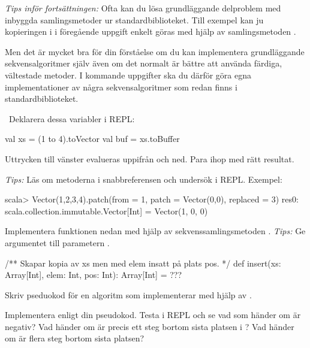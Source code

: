 \ifPreSolution
\begin{framed}
\noindent\emph{Tips inför fortsättningen:} Ofta kan du lösa grundläggande delproblem med inbyggda samlingsmetoder ur standardbiblioteket. Till exempel kan ju kopieringen i  i föregående uppgift enkelt göras med hjälp av samlingsmetoden .

Men det är mycket bra för din förståelse om du kan implementera grundläggande sekvensalgoritmer själv även om det normalt är bättre att använda färdiga, vältestade  metoder. I kommande uppgifter ska du därför göra egna implementationer av några sekvensalgoritmer som redan finns i standardbiblioteket.
\end{framed}
\fi




\QUESTBEGIN

\Task \what~Deklarera dessa variabler i REPL:

\begin{Code}
val xs = (1 to 4).toVector
val buf = xs.toBuffer
\end{Code}

\Subtask Uttrycken till vänster evalueras uppifrån och ned. Para ihop med rätt resultat.

\begin{ConceptConnections}

\end{ConceptConnections}
\emph{Tips:} Läs om metoderna i snabbreferensen och undersök i REPL. Exempel:
\begin{REPL}
scala> Vector(1,2,3,4).patch(from = 1, patch = Vector(0,0), replaced = 3)
res0: scala.collection.immutable.Vector[Int] = Vector(1, 0, 0)
\end{REPL}

\Subtask Implementera funktionen  nedan med hjälp av sekvenssamlingsmetoden . \emph{Tips:} Ge argumentet  till parametern .
\begin{Code}
/** Skapar kopia av xs men med elem insatt på plats pos. */
def insert(xs: Array[Int], elem: Int, pos: Int): Array[Int] = ???
\end{Code}

\Subtask Skriv pseduokod för en algoritm som implementerar  med hjälp av .

\Subtask Implementera  enligt din pseudokod. Testa i REPL och se vad som händer om  är negativ? Vad händer om  är precis ett steg bortom sista platsen i ? Vad händer om  är flera steg bortom sista platsen?

